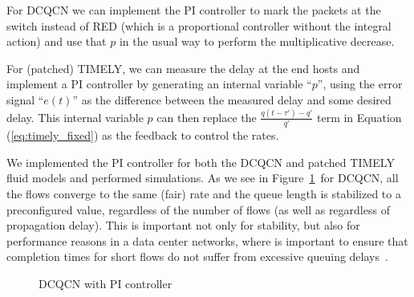 For DCQCN we can implement the PI controller to mark the packets at the switch
instead of RED (which is a proportional controller without the integral action)
and use that $p$ in the usual way to perform the multiplicative decrease. 

For (patched) TIMELY, we can measure the delay at the end hosts and implement a
PI controller by generating an internal variable ``$p$'', using the error signal
``$e(t)$'' as the difference between the measured delay and some
desired delay. This internal variable $p$ can then replace the $\tfrac{{q(t -
\tau ') - q'}}{{q'}}$ term in Equation (\ref{eq:timely_fixed}) as the feedback
to control the rates.

We implemented the PI controller for both the DCQCN and patched TIMELY fluid
models and performed simulations. As we see in Figure~\ref{fig:dcqcn_pi}~for
DCQCN, all the flows converge to the same (fair) rate and the queue length is stabilized to a preconfigured value, regardless of
the number of flows (as well as regardless of propagation delay). This is
important not only for stability, but also for performance reasons in a data
center networks, where is important to ensure that completion times for short
flows do not suffer from excessive queuing delays~\cite{dctcp}.

\begin{figure}
\vspace{-1em}
\caption{DCQCN with PI controller}
\label{fig:dcqcn_pi}
\vspace{-1em}
\end{figure}

